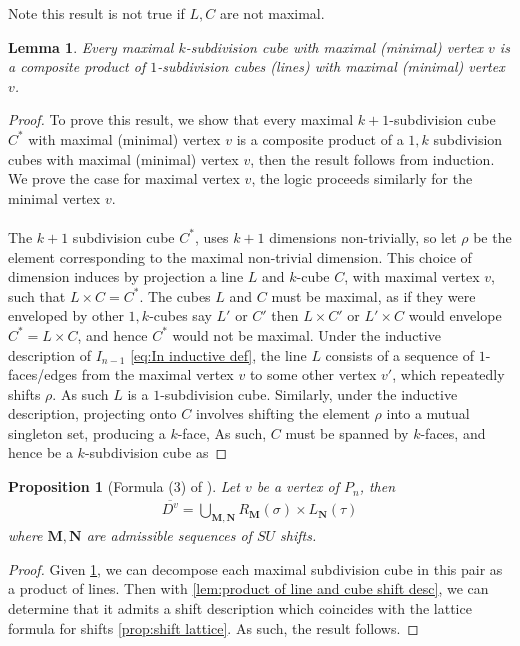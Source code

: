 \documentclass{amsart}
\newcommand{\Kurt}[1]{\todo[color=orange!30]{\rm #1 \\ \hfill --- K.}}
\newtheorem{proposition}[theorem]{Proposition}
\newtheorem{lemma}[theorem]{Lemma}
\theoremstyle{definition}
\newcommand{\maxsubdivpairsv}{\overline{D^v}}
\begin{document}
Note this result is not true if $L,C$ are not maximal. \Kurt{look at $I_3$}


\begin{lemma}\label{lem:every cube is product of lines}
Every maximal $k$-subdivision cube with maximal (minimal) vertex $v$ is a composite product of $1$-subdivision cubes (lines) with maximal (minimal) vertex $v$.
\end{lemma}
\begin{proof}
To prove this result, we show that every maximal $k+1$-subdivision cube $C^*$ with maximal (minimal) vertex $v$ is a composite product of a $1,k$ subdivision cubes with maximal (minimal) vertex $v$, then the result follows from induction.
We prove the case for maximal vertex $v$, the logic proceeds similarly for the minimal vertex $v$.
\\\\
The $k+1$ subdivision cube $C^*$, uses $k+1$ dimensions non-trivially, so let $\rho$ be the element corresponding to the maximal non-trivial dimension.
This choice of dimension induces by projection a line $L$ and $k$-cube $C$, with maximal vertex $v$, such that $L\times C = C^*$.
The cubes $L$ and $C$ must be maximal, as if they were enveloped by other $1,k$-cubes say $L'$ or $C'$ then $L \times C'$ or $L'\times C$ would envelope $C^* = L\times C$, and hence $C^*$ would not be maximal.
Under the inductive description of $I_{n-1}$ \cref{eq:In inductive def}, the line $L$ consists of a sequence of $1$-faces/edges from the maximal vertex $v$ to some other vertex $v'$, which repeatedly shifts $\rho$.
As such $L$ is a $1$-subdivision cube.
Similarly, under the inductive description, projecting onto $C$ involves shifting the element $\rho$ into a mutual singleton set, producing a $k$-face,
As such, $C$ must be spanned by $k$-faces, and hence be a $k$-subdivision cube as

\end{proof}

\begin{proposition}
[Formula (3) of \cite{saneblidzeComparingDiagonalsAssociahedra2022}]
Let $v$ be a vertex of $P_n$, then
\begin{align*}
    \maxsubdivpairsv = \bigcup_{\mathbf{M},\mathbf{N}} R_\mathbf{M}(\sigma) \times L_{\mathbf{N}}(\tau)
\end{align*}
where $\mathbf{M},\mathbf{N}$ are admissible sequences of $SU$ shifts.
\end{proposition}

\begin{proof}
Given \cref{lem:every cube is product of lines}, we can decompose each maximal subdivision cube in this pair as a product of lines.
Then with \cref{lem:product of line and cube shift desc}, we can determine that it admits a shift description which coincides with the lattice formula for shifts \cref{prop:shift lattice}.
As such, the result follows.
\end{proof}
\end{document}
